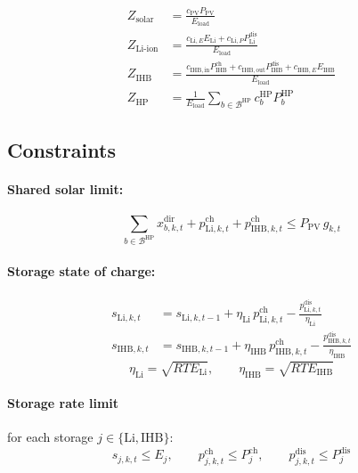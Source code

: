 \documentclass[11pt]{article}
\newcommand{\Li}{\mathrm{Li}}
\newcommand{\IHB}{\mathrm{IHB}}
\newcommand{\HP}{\mathrm{HP}}
\newcommand{\PV}{\mathrm{PV}}
\newcommand{\ch}{\mathrm{ch}}
\newcommand{\dis}{\mathrm{dis}}
\newcommand{\Eload}{E_{\mathrm{load}}}
\begin{document}
\begin{align}
Z_{\mathrm{solar}}   &= \frac{c_{\PV}P_{\PV}}{\Eload} \\
Z_{\text{Li-ion}}    &= \frac{c_{\Li,E}E_{\Li} + c_{\Li,P}P_{\Li}^{\dis}}{\Eload} \\
Z_{\IHB}             &= \frac{c_{\IHB,\mathrm{in}}P_{\IHB}^{\ch} + c_{\IHB,\mathrm{out}}P_{\IHB}^{\dis} + c_{\IHB,E}E_{\IHB}}{\Eload} \\
Z_{\HP}              &= \frac{1}{\Eload}\sum_{b \in \mathcal{B}^{\HP}} c_{b}^{\HP}P_{b}^{\HP}
\end{align}

\subsection*{Constraints}

\paragraph{Shared solar limit:}
\begin{equation}
\sum_{b \in \mathcal{B}^{\HP}} x_{b,k,t}^{\mathrm{dir}} + p_{\Li,k,t}^{\ch} + p_{\IHB,k,t}^{\ch} \leq P_{\PV}\, g_{k,t}
\label{eq:solar}
\end{equation}

\paragraph{Storage state of charge:}
\begin{align}
s_{\Li,k,t}  &= s_{\Li,k,t-1} + \eta_{\Li}\, p_{\Li,k,t}^{\ch} - \frac{p_{\Li,k,t}^{\dis}}{\eta_{\Li}} \label{eq:soc-li}\\
s_{\IHB,k,t} &= s_{\IHB,k,t-1} + \eta_{\IHB}\, p_{\IHB,k,t}^{\ch} - \frac{p_{\IHB,k,t}^{\dis}}{\eta_{\IHB}} \label{eq:soc-ihb}
\end{align}
\begin{equation}
\eta_{\Li} = \sqrt{RTE_{\Li}}, \qquad \eta_{\IHB} = \sqrt{RTE_{\IHB}}
\end{equation}

\paragraph{Storage rate limit} for each storage $j \in \{\Li, \IHB\}$:
\begin{equation}
s_{j,k,t} \leq E_{j}, \qquad p_{j,k,t}^{\ch} \leq P_{j}^{\ch}, \qquad p_{j,k,t}^{\dis} \leq P_{j}^{\dis}
\label{eq:rate}
\end{equation}
\end{document}
